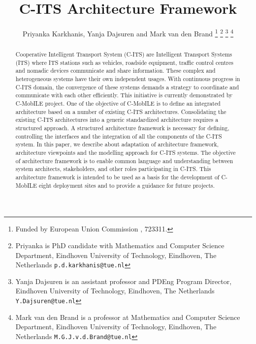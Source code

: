 \documentclass[letterpaper, 10 pt, conference]{ieeeconf}  %
\title{\LARGE \bf
C-ITS Architecture Framework
}
\author{Priyanka Karkhanis, Yanja Dajsuren and Mark van den Brand%
\thanks{Funded by European Union Commission , 723311.}%
\thanks{Priyanka is PhD candidate with Mathematics and Computer Science Department,
     Eindhoven University of Technology, Eindhoven, The Netherlands
        {\tt\small p.d.karkhanis@tue.nl}}%
\thanks{Yanja Dajsuren is an assistant professor and PDEng Program Director,
	 Eindhoven University of Technology, Eindhoven, The Netherlands
        {\tt\small Y.Dajsuren@tue.nl}}%
\thanks{Mark van den Brand is a professor at Mathematics and Computer Science Department,
  	 Eindhoven University of Technology, Eindhoven, The Netherlands
  	{\tt\small M.G.J.v.d.Brand@tue.nl}}%
}
\begin{document}
\maketitle
\thispagestyle{empty}
\pagestyle{empty}


\begin{abstract}

Cooperative Intelligent Transport System (C-ITS) are Intelligent Transport Systems (ITS) where ITS stations such as vehicles, roadside equipment, traffic control centres and nomadic devices communicate and share information. These complex and heterogeneous systems have their own independent usages. With continuous progress in C-ITS domain, the convergence of these systems demands a strategy to coordinate and communicate with each other efficiently. This initiative is currently demonstrated by C-MobILE project. One of the objective of C-MobILE is to define an integrated architecture based on a number of existing C-ITS architectures. Consolidating the existing C-ITS architectures into a generic standardized architecture requires a structured approach. A structured architecture framework is necessary for defining, controlling the interfaces and the integration of all the components of the C-ITS system.
In this paper, we describe about adaptation of architecture framework, architecture viewpoints and the modelling approach for C-ITS systems. The objective of architecture framework is to enable common language and understanding between system architects, stakeholders, and other roles participating in C-ITS. This architecture framework is intended to be used as a basis for the development of C-MobILE eight deployment sites and to provide a guidance for future projects.

\end{abstract}


\end{document}
